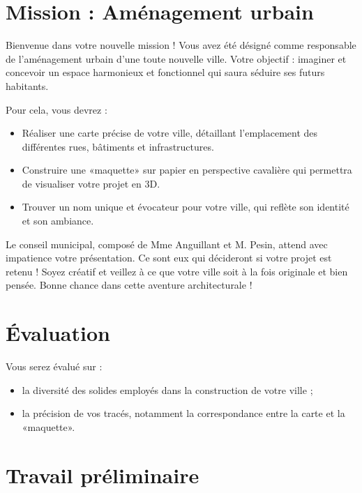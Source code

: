 \emptyBackground
\def\authors{Mme ANGOUILLANT et M PESIN}

\small

\section*{Mission : Aménagement urbain}
\vspace{-0.15cm}

Bienvenue dans votre nouvelle mission !
Vous avez été désigné comme responsable de l'aménagement urbain d'une toute nouvelle ville.
Votre objectif : imaginer et concevoir un espace harmonieux et fonctionnel qui saura séduire ses futurs habitants.

Pour cela, vous devrez :
\begin{itemize}
    \item Réaliser une carte précise de votre ville, détaillant l'emplacement des différentes rues, bâtiments et infrastructures.
    \item Construire une «maquette» sur papier en perspective cavalière qui permettra de visualiser votre projet en 3D.
    \item Trouver un nom unique et évocateur pour votre ville, qui reflète son identité et son ambiance.
\end{itemize}

Le conseil municipal, composé de Mme Anguillant et M. Pesin, attend avec impatience votre présentation.
Ce sont eux qui décideront si votre projet est retenu !
Soyez créatif et veillez à ce que votre ville soit à la fois originale et bien pensée.
Bonne chance dans cette aventure architecturale !
\vspace{-0.5cm}
\section*{Évaluation}
\vspace{-0.15cm}
Vous serez évalué sur :
\begin{itemize}
    \item la diversité des solides employés dans la construction de votre ville ;
    \item la précision de vos tracés, notamment la correspondance entre la carte et la «maquette».
\end{itemize}

\vspace{-0.5cm}
\section*{Travail préliminaire}
\vspace{-0.15cm}

